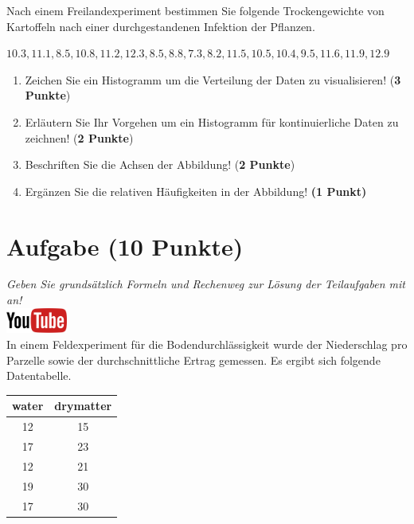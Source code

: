 \documentclass[a4paper, 9pt]{scrartcl}\usepackage[]{graphicx}\usepackage[]{xcolor}
\begin{document}
Nach einem Freilandexperiment bestimmen Sie folgende Trockengewichte von
Kartoffeln nach einer durchgestandenen Infektion der Pflanzen. 

\begin{center}
$10.3, 11.1, 8.5, 10.8, 11.2, 12.3, 8.5, 8.8, 7.3, 8.2, 11.5, 10.5, 10.4, 9.5, 11.6, 11.9, 12.9$
\end{center}

\begin{enumerate}
\item Zeichen Sie ein Histogramm um die Verteilung der Daten zu
  visualisieren! (\textbf{3 Punkte})
 \item Erl{\"a}utern Sie Ihr Vorgehen um ein Histogramm f{\"u}r kontinuierliche
  Daten zu zeichnen!  (\textbf{2 Punkte})
\item Beschriften Sie die Achsen der Abbildung! (\textbf{2 Punkte})
\item Erg{\"a}nzen Sie die relativen H{\"a}ufigkeiten in der Abbildung! \textbf{(1
    Punkt)}  
\end{enumerate}

 
\clearpage

\section{Aufgabe \hfill (10 Punkte)}

\textit{Geben Sie grunds{\"a}tzlich Formeln und Rechenweg zur L{\"o}sung der
  Teilaufgaben mit an!} \\[1Ex]

\hfill\href{https://youtu.be/VAqiUdV4WQ0}{\includegraphics[width =
  2cm]{img/youtube}}\\[1Ex]

In einem Feldexperiment f{\"u}r die Bodendurchl{\"a}ssigkeit wurde der Niederschlag
pro Parzelle sowie der durchschnittliche Ertrag gemessen. Es ergibt sich
folgende Datentabelle. 

\begin{table}[!h]
\centering
\begin{tabular}{cc}
\toprule
water & drymatter\\
\midrule
12 & 15\\
17 & 23\\
12 & 21\\
19 & 30\\
17 & 30\\
\bottomrule
\end{tabular}
\end{table}
\end{document}

